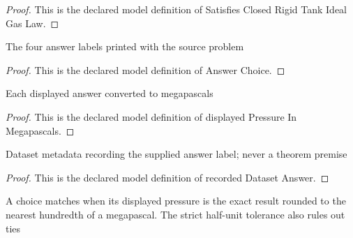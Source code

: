 \begin{proof}
  This is the declared model definition of Satisfies Closed Rigid Tank Ideal Gas Law.
\end{proof}
\begin{definition}
  \label{def:physics:phyx-mini-0443:phyxminiproblems-problemphyxmini0443-answerchoice}
  The four answer labels printed with the source problem
\end{definition}
\begin{proof}
  This is the declared model definition of Answer Choice.
\end{proof}
\begin{definition}
  \label{def:physics:phyx-mini-0443:phyxminiproblems-problemphyxmini0443-displayedpressureinmegapascals}
  Each displayed answer converted to megapascals
\end{definition}
\begin{proof}
  This is the declared model definition of displayed Pressure In Megapascals.
\end{proof}
\begin{definition}
  \label{def:physics:phyx-mini-0443:phyxminiproblems-problemphyxmini0443-recordeddatasetanswer}
  Dataset metadata recording the supplied answer label; never a theorem premise
\end{definition}
\begin{proof}
  This is the declared model definition of recorded Dataset Answer.
\end{proof}
\begin{definition}
  \label{def:physics:phyx-mini-0443:phyxminiproblems-problemphyxmini0443-matchesdisplayedpressure}
  A choice matches when its displayed pressure is the exact result rounded to the nearest hundredth of a megapascal. The strict half-unit tolerance also rules out ties
\end{definition}
